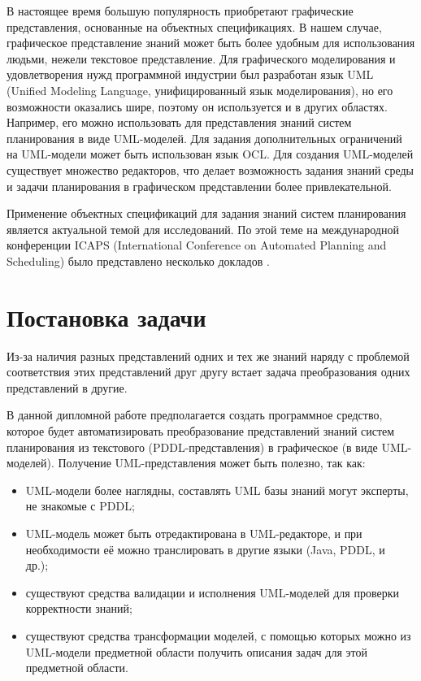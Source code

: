 \documentclass[a4paper,14pt]{extreport}
\begin{document}
    В настоящее время большую популярность приобретают графические представления, основанные на объектных спецификациях. В нашем случае, графическое представление знаний может быть более удобным для использования людьми, нежели текстовое представление. Для графического моделирования и удовлетворения нужд программной индустрии был разработан язык UML\cite{rambo-uml2} (Unified Modeling Language, унифицированный язык моделирования), но его возможности оказались шире, поэтому он используется и в других областях. Например, его можно использовать для представления знаний систем планирования в виде UML-моделей. Для задания дополнительных ограничений на UML-модели может быть использован язык OCL\cite{ocl}. Для создания UML-моделей существует множество редакторов, что делает возможность задания знаний среды и задачи планирования в графическом представлении более привлекательной. 
    
    Применение объектных спецификаций для задания знаний систем планирования является актуальной темой для исследований.  По этой теме на международной конференции ICAPS (International Conference on Automated Planning and Scheduling) было представлено несколько докладов \cite{icaps-1, icaps-2}.
    
   
    
\section*{Постановка задачи}

     Из-за наличия разных представлений одних и тех же знаний наряду с проблемой соответствия этих представлений друг другу встает задача преобразования одних представлений в другие. 

    В данной дипломной работе предполагается создать программное средство, которое будет автоматизировать преобразование представлений знаний систем планирования из текстового (PDDL-представления) в графическое (в виде UML-моделей). Получение UML-представления может быть полезно, так как:
    \begin{itemize}
        \item UML-модели более наглядны, составлять UML базы знаний могут эксперты, не знакомые с PDDL;
        \item UML-модель может быть отредактирована в UML-редакторе, и при необходимости её можно транслировать в другие языки (Java, PDDL, и~ др.);
        \item существуют средства валидации и исполнения UML-моделей для проверки корректности знаний\cite{use}; 
        \item существуют средства трансформации моделей, с помощью которых можно из UML-модели предметной области получить описания задач для этой предметной области.
    \end{itemize}
\end{document}
